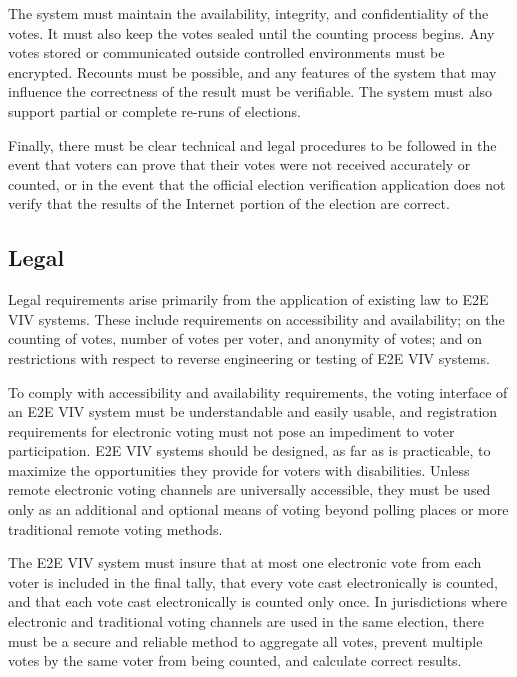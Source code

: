The system must maintain the availability, integrity, and
confidentiality of the votes. It must also keep the votes sealed until
the counting process begins. Any votes stored or communicated outside
controlled environments must be encrypted. Recounts must be possible,
and any features of the system that may influence the correctness of
the result must be verifiable. The system must also support partial or
complete re-runs of elections. 

Finally, there must be clear technical and legal procedures to be
followed in the event that voters can prove that their votes were not
received accurately or counted, or in the event that the official
election verification application does not verify that the results of
the Internet portion of the election are correct.

\subsection{Legal}

Legal requirements arise primarily from the application of existing
law to E2E VIV systems. These include requirements on accessibility
and availability; on the counting of votes, number of votes per voter,
and anonymity of votes; and on restrictions with respect to reverse
engineering or testing of E2E VIV systems.

To comply with accessibility and availability requirements, the voting
interface of an E2E VIV system must be understandable and easily
usable, and registration requirements for electronic voting must not
pose an impediment to voter participation. E2E VIV systems should be
designed, as far as is practicable, to maximize the opportunities they
provide for voters with disabilities. Unless remote electronic voting channels are
universally accessible, they must be used only as an additional and
optional means of voting beyond polling places or more traditional
remote voting methods. 

The E2E VIV system must insure that at most one electronic vote from
each voter is included in the final tally, that every vote cast
electronically is counted, and that each vote cast electronically is
counted only once. In jurisdictions where electronic and traditional
voting channels are used in the same election, there must be a secure
and reliable method to aggregate all votes, prevent multiple votes by
the same voter from being counted, and calculate correct results.

